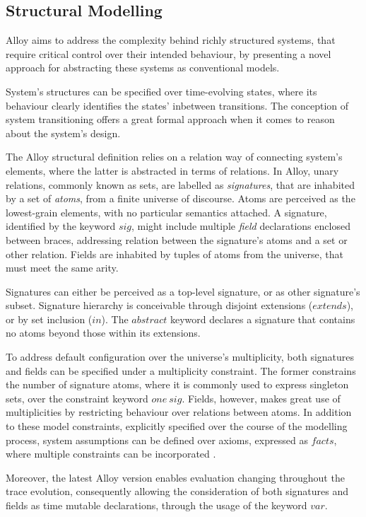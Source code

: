 \subsection{Structural Modelling}\label{c:alloy-sm}

Alloy aims to address the complexity behind richly structured systems, that require critical control over their intended behaviour, by presenting a novel approach for abstracting these systems as conventional models. 

System's structures can be specified over time-evolving states, where its behaviour clearly identifies the states' inbetween transitions. The conception of system transitioning offers a great formal approach when it comes to reason about the system's design.

The Alloy structural definition relies on a relation way of connecting system's elements, where the latter is abstracted in terms of relations. In Alloy, unary relations, commonly known as sets, are labelled as \textit{signatures}, that are inhabited by a set of \textit{atoms}, from a finite universe of discourse. Atoms are perceived as the lowest-grain elements, with no particular semantics attached. A signature, identified by the keyword $sig$, might include multiple \textit{field} declarations enclosed between braces, addressing relation between the signature's atoms and a set or other relation. Fields are inhabited by tuples of atoms from the universe, that must meet the same arity.

Signatures can either be perceived as a top-level signature, or as other signature's subset. Signature hierarchy is conceivable through disjoint extensions ($extends$), or by set inclusion ($in$). The $abstract$ keyword declares a signature that contains no atoms beyond those within its extensions. 

To address default configuration over the universe's multiplicity, both signatures and fields can be specified under a multiplicity constraint. The former constrains the number of signature atoms, where it is commonly used to express singleton sets, over the constraint keyword $one\ sig$. Fields, however, makes great use of multiplicities by restricting behaviour over relations between atoms. In addition to these model constraints, explicitly specified over the course of the modelling process, system assumptions can be defined over axioms, expressed as $facts$, where multiple constraints can be incorporated \cite{gheyi2007formally}.

Moreover, the latest Alloy version enables evaluation changing throughout the trace evolution, consequently allowing the consideration of both signatures and fields as time mutable declarations, through the usage of the keyword $var$.


